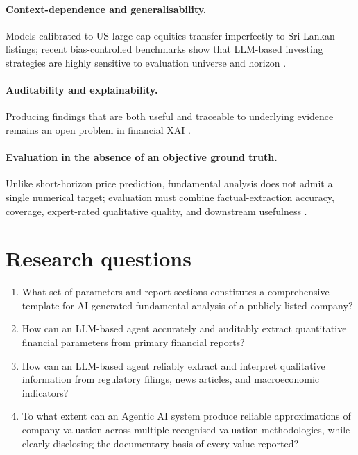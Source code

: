 \paragraph{\textbf{Context-dependence and generalisability.}} Models calibrated to US large-cap equities transfer imperfectly to Sri Lankan listings; recent bias-controlled benchmarks show that LLM-based investing strategies are highly sensitive to evaluation universe and horizon \citep{Li2026FINSABER,Bangun2025}.

\paragraph{\textbf{Auditability and explainability.}} Producing findings that are both useful and traceable to underlying evidence remains an open problem in financial XAI \citep{Cernevicene2024,Acharya2025AgenticAI}.

\paragraph{\textbf{Evaluation in the absence of an objective ground truth.}} Unlike short-horizon price prediction, fundamental analysis does not admit a single numerical target; evaluation must combine factual-extraction accuracy, coverage, expert-rated qualitative quality, and downstream usefulness \citep{Papasotiriou2024,Provakar2024QA}.




\section{Research questions}
\label{sec:rq}

\begin{enumerate}[label=\textbf{RQ\arabic*:}, leftmargin=3.2em]
    \item What set of parameters and report sections constitutes a comprehensive template for AI-generated fundamental analysis of a publicly listed company?
    \item How can an LLM-based agent accurately and auditably extract quantitative financial parameters from primary financial reports?
    \item How can an LLM-based agent reliably extract and interpret qualitative information from regulatory filings, news articles, and macroeconomic indicators?
    \item To what extent can an Agentic AI system produce reliable approximations of company valuation across multiple recognised valuation methodologies, while clearly disclosing the documentary basis of every value reported?
\end{enumerate}


